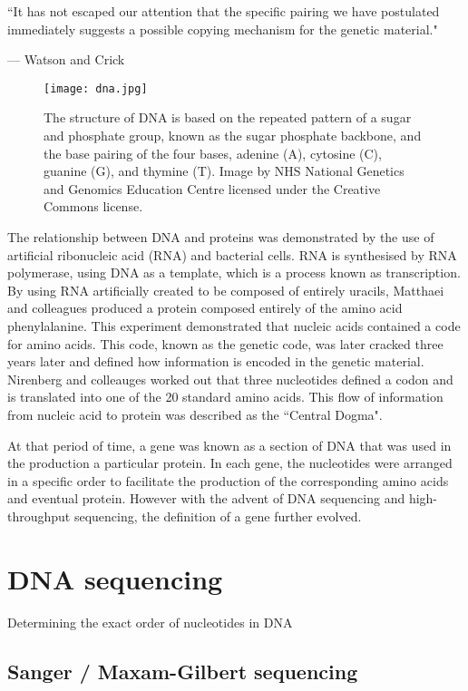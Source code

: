 \epigraph{``It has not escaped our attention that the specific pairing we have postulated immediately suggests a possible copying mechanism for the genetic material."}{--- \textup{Watson and Crick}}

\begin{figure}[h]
   \centering
   \texttt{[image: dna.jpg]}
   \caption[The structure of DNA]{The structure of DNA is based on the repeated pattern of a sugar and phosphate group, known as the sugar phosphate backbone, and the base pairing of the four bases, adenine (A), cytosine (C), guanine (G), and thymine (T). Image by NHS National Genetics and Genomics Education Centre licensed under the Creative Commons license.}
   \label{fig:dna}
\end{figure}

The relationship between DNA and proteins was demonstrated by the use of artificial ribonucleic acid (RNA) and bacterial cells\cite{pmid14471390}. RNA is synthesised by RNA polymerase, using DNA as a template, which is a process known as transcription. By using RNA artificially created to be composed of entirely uracils, Matthaei and colleagues produced a protein composed entirely of the amino acid phenylalanine. This experiment demonstrated that nucleic acids contained a code for amino acids. This code, known as the genetic code, was later cracked three years later\cite{pmid5330357} and defined how information is encoded in the genetic material. Nirenberg and colleauges worked out that three nucleotides defined a codon and is translated into one of the 20 standard amino acids. This flow of information from nucleic acid to protein was described as the ``Central Dogma"\cite{crick1958protein}.

At that period of time, a gene was known as a section of DNA that was used in the production a particular protein. In each gene, the nucleotides were arranged in a specific order to facilitate the production of the corresponding amino acids and eventual protein. However with the advent of DNA sequencing and high-throughput sequencing, the definition of a gene further evolved.

\section{DNA sequencing}

Determining the exact order of nucleotides in DNA

\subsection{Sanger / Maxam-Gilbert sequencing}

